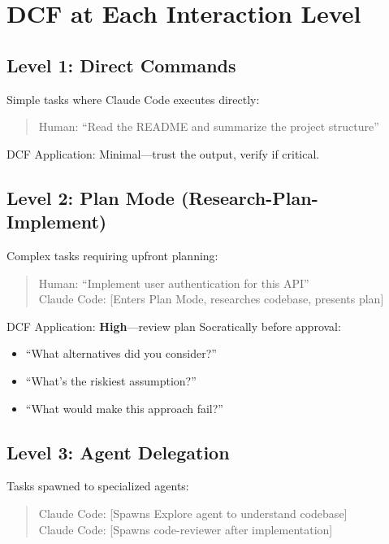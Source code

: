 \chapter{DCF at Each Interaction Level}

\section{Level 1: Direct Commands}

Simple tasks where Claude Code executes directly:

\begin{quote}
Human: ``Read the README and summarize the project structure''
\end{quote}

DCF Application: Minimal---trust the output, verify if critical.

\section{Level 2: Plan Mode (Research-Plan-Implement)}

Complex tasks requiring upfront planning:

\begin{quote}
Human: ``Implement user authentication for this API'' \\
Claude Code: [Enters Plan Mode, researches codebase, presents plan]
\end{quote}

DCF Application: \textbf{High}---review plan Socratically before approval:
\begin{itemize}
    \item ``What alternatives did you consider?''
    \item ``What's the riskiest assumption?''
    \item ``What would make this approach fail?''
\end{itemize}

\section{Level 3: Agent Delegation}

Tasks spawned to specialized agents:

\begin{quote}
Claude Code: [Spawns Explore agent to understand codebase] \\
Claude Code: [Spawns code-reviewer after implementation]
\end{quote}


